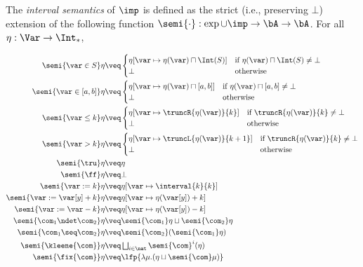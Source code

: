 The \emph{interval semantics} of \(\imp\) is defined as the strict (i.e., preserving \(\bot\))
extension of the following function
\(\semi{\cdot}: \exp \cup \imp \to \bA \to \bA\). For all \(\eta: \Var \to \Int_*\),

\begin{align*}
  \semi{\var \in S}\eta 
  & \veq  
  \begin{cases}
    \eta[\var \mapsto \eta(\var)\sqcap \Int(S)]  & \text{if }\eta(\var)\sqcap \Int(S)\neq \bot \\
    \bot & \text{otherwise}
  \end{cases}\\
  \semi{\var \in [a,b]}\eta 
  & \veq  
  \begin{cases}
    \eta[\var \mapsto \eta(\var)\sqcap [a,b]]  & \text{if }\eta(\var)\sqcap [a,b]\neq \bot \\
    \bot & \text{otherwise}
  \end{cases}\\
  \semi{\var \leq k}\eta 
  & \veq 
  \begin{cases}
    \eta[\var \mapsto \truncR{\eta(\var)}{k}] & \text{if }\truncR{\eta(\var)}{k}\neq \bot \\
    \bot & \text{otherwise}
  \end{cases}\\
  \semi{\var > k}\eta 
  & \veq 
  \begin{cases}
    \eta[\var \mapsto \truncL{\eta(\var)}{k+1}] & \text{if }\truncR{\eta(\var)}{k}\neq \bot \\
    \bot & \text{otherwise}
  \end{cases}\\
  \semi{\tru}\eta 
  & \veq \eta\\
  \semi{\ff}\eta 
  & \veq \bot\\
  \semi{\var := k}\eta 
  & \veq \eta[\var \mapsto \interval{k}{k}]\\
  \semi{\var := \var[y] + k}\eta 
  & \veq \eta[\var \mapsto \eta (\var[y]) + k]\\
  \semi{\var := \var - k}\eta 
  & \veq \eta[\var \mapsto \eta (\var[y]) - k]\\
  \semi{\com_1 \ndet \com_2} \eta
  & \veq \semi{\com_1} \eta \sqcup \semi{\com_2} \eta\\
  \semi{\com_1 \seq \com_2} \eta
  & \veq \semi{\com_2} (\semi{\com_1} \eta)\\
  \semi{\kleene{\com}} \eta
  & \veq \textstyle \bigsqcup_{i \in \nat} \semi{\com}^i (\eta)\\
  \semi{\fix{\com}} \eta
  & \veq  \lfp{\lambda \mu. (\eta \sqcup \semi{\com} \mu)}
\end{align*}

